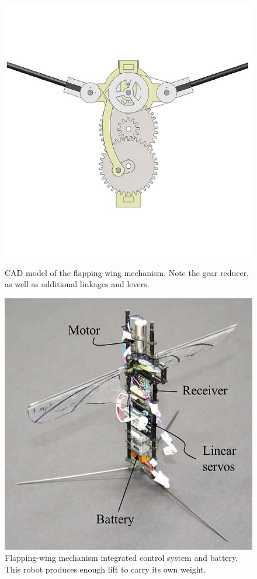 \begin{figure}
\centering
{}
\includegraphics[width=\textwidth]{Files/Figures/gears.png}
\caption[Gear reducer with spur gears]{CAD model of the flapping-wing mechanism. \cite{Phan2015} Note the gear reducer, as well as additional linkages and levers.}
\label{fig:gear_reducer}
\endminipage\hfill
{}
\includegraphics[width=\textwidth]{Files/Figures/gears_fwmav.png}
\caption[Assembled FWMAV with gear reducer]{Flapping-wing mechanism integrated control system and battery. \cite{Phan2015} This robot produces enough lift to carry its own weight.}
\label{fig:gear_reducer_fwmav}
\endminipage\hfill
\end{figure}

